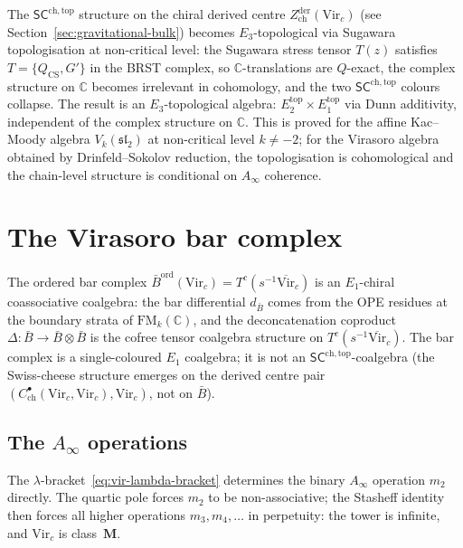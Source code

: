 \documentclass[11pt,reqno]{amsart}
\theoremstyle{definition}
\theoremstyle{remark}
\begin{document}
The $\mathsf{SC}^{\mathrm{ch,top}}$ structure on the chiral derived
centre $Z^{\mathrm{der}}_{\mathrm{ch}}(\mathrm{Vir}_c)$ (see
Section~\ref{sec:gravitational-bulk}) becomes $E_3$-topological
via Sugawara topologisation at non-critical level: the Sugawara
stress tensor $T(z)$ satisfies $T = \{Q_{\mathrm{CS}}, G'\}$ in the
BRST complex, so $\mathbb{C}$-translations are $Q$-exact, the
complex structure on $\mathbb{C}$ becomes irrelevant in cohomology,
and the two $\mathsf{SC}^{\mathrm{ch,top}}$ colours collapse. The
result is an $E_3$-topological algebra: $E_2^{\mathrm{top}} \times
E_1^{\mathrm{top}}$ via Dunn additivity, independent of the complex
structure on $\mathbb{C}$. This is proved for the affine Kac--Moody
algebra $V_k(\mathfrak{sl}_2)$ at non-critical level $k \ne -2$; for
the Virasoro algebra obtained by Drinfeld--Sokolov reduction, the
topologisation is cohomological and the chain-level structure is
conditional on $A_\infty$ coherence.

\section{The Virasoro bar complex}
\label{sec:vir-bar-complex}

The ordered bar complex $\bar{B}^{\mathrm{ord}}(\mathrm{Vir}_c)
= T^c(s^{-1}\overline{\mathrm{Vir}}_c)$
is an $E_1$-chiral coassociative coalgebra: the bar differential
$d_{\bar{B}}$ comes from the OPE residues at the boundary strata of
$\mathrm{FM}_k(\mathbb{C})$, and the deconcatenation coproduct
$\Delta\colon \bar{B} \to \bar{B} \otimes \bar{B}$ is the cofree
tensor coalgebra structure on $T^c(s^{-1}\overline{\mathrm{Vir}}_c)$.
The bar complex is a single-coloured $E_1$ coalgebra; it is not an
$\mathsf{SC}^{\mathrm{ch,top}}$-coalgebra (the Swiss-cheese structure
emerges on the derived centre pair
$(C^\bullet_{\mathrm{ch}}(\mathrm{Vir}_c, \mathrm{Vir}_c),
\mathrm{Vir}_c)$, not on $\bar{B}$).

\subsection{The $A_\infty$ operations}

The $\lambda$-bracket~\eqref{eq:vir-lambda-bracket} determines the
binary $A_\infty$ operation $m_2$ directly. The quartic pole forces
$m_2$ to be non-associative; the Stasheff identity then forces all
higher operations $m_3, m_4, \ldots$ in perpetuity: the tower is
infinite, and $\mathrm{Vir}_c$ is class~$\mathbf{M}$.
\end{document}

